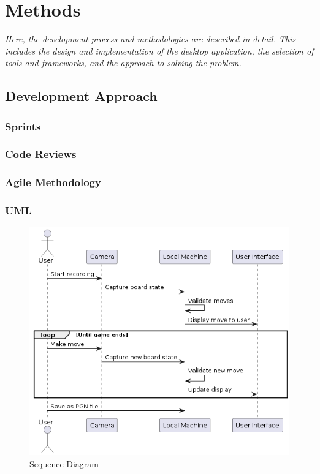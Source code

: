 \chapter{Methods}

\begin{center}
    \textit{Here, the development process and methodologies are described in detail. This includes the design and implementation of the desktop application, the selection of tools and frameworks, and the approach to solving the problem.}
\end{center}




\section{Development Approach}

\subsection{Sprints}

\subsection{Code Reviews}

\subsection{Agile Methodology}

\subsection{UML}

\begin{figure}[h!]
    \centering
    \includegraphics[width=0.75\linewidth]{figures/uml/sequence.png}
    \caption{Sequence Diagram}
    \label{fig:sequence}
\end{figure}

